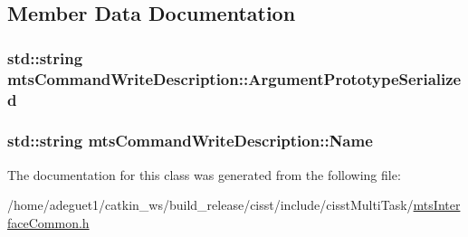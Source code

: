 \subsection{Member Data Documentation}
\hypertarget{classmts_command_write_description_ab9ad13f0cc376c013214a1aa29427dd6}{
\subsubsection[{Argument\-Prototype\-Serialized}]{\setlength{\rightskip}{0pt plus 5cm}std\-::string mts\-Command\-Write\-Description\-::\-Argument\-Prototype\-Serialized}}\label{classmts_command_write_description_ab9ad13f0cc376c013214a1aa29427dd6}
\hypertarget{classmts_command_write_description_adfbd4ce7d572235e40f8bd0621c5a78f}{
\subsubsection[{Name}]{\setlength{\rightskip}{0pt plus 5cm}std\-::string mts\-Command\-Write\-Description\-::\-Name}}\label{classmts_command_write_description_adfbd4ce7d572235e40f8bd0621c5a78f}


The documentation for this class was generated from the following file\-:\begin{DoxyCompactItemize}
\item 
/home/adeguet1/catkin\-\_\-ws/build\-\_\-release/cisst/include/cisst\-Multi\-Task/\hyperlink{mts_interface_common_8h}{mts\-Interface\-Common.\-h}\end{DoxyCompactItemize}
